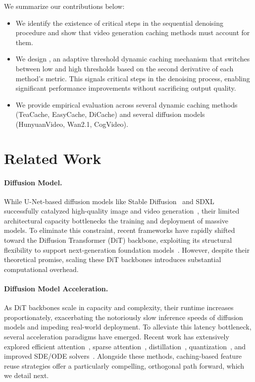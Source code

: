 \documentclass{article}
\begin{document}
We summarize our contributions below:
\begin{itemize}
    \item We identify the existence of critical steps in the sequential denoising procedure and show that video generation caching methods must account for them.

    \item We design \system, an adaptive threshold dynamic caching mechanism that switches between low and high thresholds based on the second derivative of each method's metric. This signals critical steps in the denoising process, enabling significant performance improvements without sacrificing output quality.

    \item We provide empirical evaluation across several dynamic caching methods (TeaCache, EasyCache, DiCache) and several diffusion models (HunyuanVideo, Wan2.1, CogVideo).
\end{itemize}


\section{Related Work}

\paragraph{Diffusion Model.}
While U-Net-based diffusion models like Stable Diffusion~\cite{rombach2022ldm} and SDXL~\cite{podell2023sdxl} successfully catalyzed high-quality image and video generation~\cite{guo2023animatediff, chen2024videocrafter2, blattmann2023svd}, their limited architectural capacity bottlenecks the training and deployment of massive models. To eliminate this constraint, recent frameworks have rapidly shifted toward the Diffusion Transformer (DiT) backbone, exploiting its structural flexibility to support next-generation foundation models~\cite{esser2024scaling, blackforestlabs2024flux, chen2023pixart, peebles2023scalable}. However, despite their theoretical promise, scaling these DiT backbones introduces substantial computational overhead.

\paragraph{Diffusion Model Acceleration.}
As DiT backbones scale in capacity and complexity, their runtime increases proportionately, exacerbating the notoriously slow inference speeds of diffusion models and impeding real-world deployment. To alleviate this latency bottleneck, several acceleration paradigms have emerged. Recent work has extensively explored efficient attention~\cite{dao2022flashattention, li2024svdquant}, sparse attention~\cite{xi2025sparsevideogen, ren2025grouping}, distillation~\cite{meng2023distillation, sauer2024adversarial, wang2023videolcm}, quantization~\cite{li2024svdquant}, and improved SDE/ODE solvers~\cite{lu2022dpmsolver}. Alongside these methods, caching-based feature reuse strategies offer a particularly compelling, orthogonal path forward, which we detail next.
\end{document}
